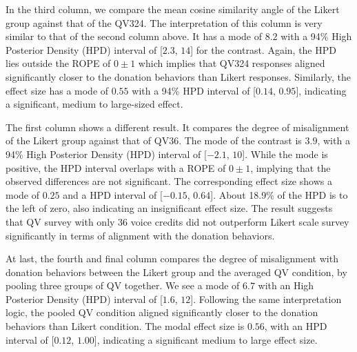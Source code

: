 In the third column, we compare the mean cosine similarity angle of the Likert group
against that of the QV324. The interpretation of this column is very similar to that of the second column above. It has a mode of $8.2$ with a 94\% High Posterior Density (HPD) interval of [$2.3$, $14$] for the contrast. Again, the HPD lies outside the ROPE of $0 \pm 1$ which implies that QV324 responses aligned significantly closer to the donation behaviors than Likert responses. Similarly, the effect size has a mode of $0.55$ with a 94\% HPD interval of [$0.14$, $0.95$], indicating a significant, medium to large-sized effect.

The first column shows a different result. It compares the degree of misalignment of the Likert group against that of QV36. The mode of the contrast is $3.9$, with a 94\% High Posterior Density (HPD) interval of [$-2.1$, $10$]. While the mode is positive, the HPD interval overlaps with a ROPE of $0 \pm 1$, implying that the observed differences are not significant. The corresponding effect size shows a mode of $0.25$ and a HPD interval of [$-0.15$, $0.64$]. About 18.9\% of the HPD is to the left of zero, also indicating an insignificant effect size. The result suggests that QV survey with only 36 voice credits did not outperform Likert scale survey significantly in terms of alignment with the donation behaviors.

At last, the fourth and final column compares the degree of misalignment with donation behaviors between the Likert group and the averaged QV condition, by pooling three groups of QV together. We see a mode of $6.7$ with an High Posterior Density (HPD) interval of [$1.6$, $12$]. Following the same interpretation logic, the pooled QV condition aligned significantly closer to the donation behaviors than Likert condition. The modal effect size is $0.56$, with an HPD interval of [$0.12$, $1.00$], indicating a significant medium to large effect size.


